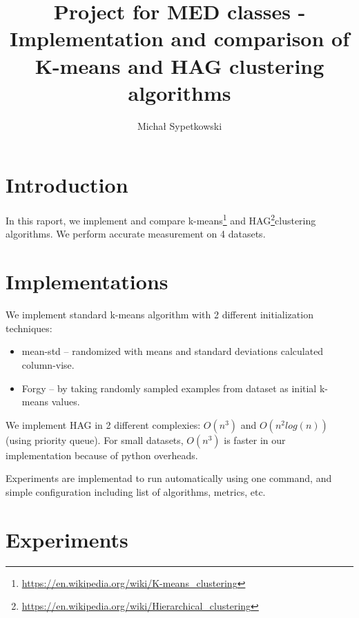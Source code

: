 \documentclass[a4paper]{article}
\begin{document}
\title{Project for MED classes - Implementation and comparison of K-means and HAG clustering algorithms}

\author{Michał Sypetkowski}
\setlength\columnsep{0.375in}  \newlength\titlebox \setlength\titlebox{2.25in}
\twocolumn
\maketitle


\section{Introduction}

In this raport, we implement and compare k-means\footnote{\url{https://en.wikipedia.org/wiki/K-means_clustering}}
and HAG\footnote{\url{https://en.wikipedia.org/wiki/Hierarchical_clustering}}clustering algorithms.
We perform accurate measurement on 4 datasets.

\section{Implementations}

We implement standard k-means algorithm with 2 different initialization techniques:
\begin{itemize}
        \item mean-std -- randomized with means and standard deviations calculated column-vise.
        \item Forgy -- by taking randomly sampled examples from dataset as initial k-means values. 
\end{itemize}

We implement HAG in 2 different complexies:
$O(n^3)$ and $O(n^2log(n))$ (using priority queue).
For small datasets, $O(n^3)$ is faster in our implementation because of python overheads.

Experiments are implementad to run automatically using one command,
and simple configuration including list of algorithms, metrics, etc.

\section{Experiments}
\end{document}
